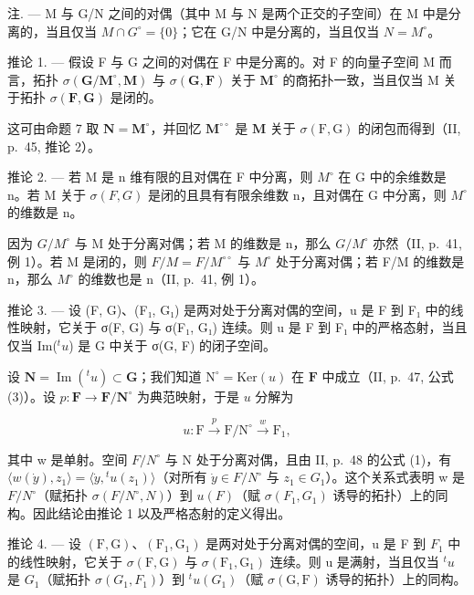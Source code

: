 注. --- M 与 G/N 之间的对偶（其中 M 与 N 是两个正交的子空间）在 M 中是分离的，当且仅当 \(M \cap G^{\circ} = \{0\}\)；它在 G/N 中是分离的，当且仅当 \(N = M^{\circ}\)。

推论 1. --- 假设 F 与 G 之间的对偶在 F 中是分离的。对 F 的向量子空间 M 而言，拓扑 \(\sigma(\mathbf{G}/\mathbf{M}^{\circ}, \mathbf{M})\) 与 \(\sigma(\mathbf{G}, \mathbf{F})\) 关于 \(\mathbf{M}^{\circ}\) 的商拓扑一致，当且仅当 M 关于拓扑 \(\sigma(\mathbf{F}, \mathbf{G})\) 是闭的。

这可由命题 7 取 \(\mathbf{N} = \mathbf{M}^{\circ}\)，并回忆 \(\mathbf{M}^{\circ \circ}\) 是 \(\mathbf{M}\) 关于 \(\sigma (\mathrm{F},\mathrm{G})\) 的闭包而得到（II, p.~45, 推论 2）。

推论 2. --- 若 M 是 n 维有限的且对偶在 F 中分离，则 \(M^{\circ}\) 在 G 中的余维数是 n。若 M 关于 \(\sigma(F, G)\) 是闭的且具有有限余维数 n，且对偶在 G 中分离，则 \(M^{\circ}\) 的维数是 n。

因为 \(G/M^{\circ}\) 与 M 处于分离对偶；若 M 的维数是 n，那么 \(G/M^{\circ}\) 亦然（II, p.~41, 例 1）。若 M 是闭的，则 \(F/M = F/M^{\circ\circ}\) 与 \(M^{\circ}\) 处于分离对偶；若 F/M 的维数是 n，那么 \(M^{\circ}\) 的维数也是 n（II, p.~41, 例 1）。

推论 3. --- 设 (F, G)、(F₁, G₁) 是两对处于分离对偶的空间，u 是 F 到 F₁ 中的线性映射，它关于 σ(F, G) 与 σ(F₁, G₁) 连续。则 u 是 F 到 F₁ 中的严格态射，当且仅当 Im(\({}^t u\)) 是 G 中关于 σ(G, F) 的闭子空间。

设 \(\mathbf{N} = \operatorname{Im}(^t u) \subset \mathbf{G}\)；我们知道 \(\mathrm{N}^{\circ} = \mathrm{Ker}(u)\) 在 \(\mathbf{F}\) 中成立（II, p.~47, 公式 (3)）。设 \(p: \mathbf{F} \to \mathbf{F}/\mathbf{N}^{\circ}\) 为典范映射，于是 \(u\) 分解为

\[
u: \mathrm{F} \xrightarrow {p} \mathrm{F} / \mathrm{N} ^ {\circ} \xrightarrow {w} \mathrm{F} _ {1},
\]

其中 w 是单射。空间 \(F/N^{\circ}\) 与 N 处于分离对偶，且由 II, p.~48 的公式 (1)，有 \(\langle w(\dot{y}), z_{1} \rangle = \langle \dot{y}, {}^{t}u(z_{1}) \rangle\)（对所有 \(\dot{y} \in F/N^{\circ}\) 与 \(z_{1} \in G_{1}\)）。这个关系式表明 w 是 \(F/N^{\circ}\)（赋拓扑 \(\sigma(F/N^{\circ}, N)\)）到 \(u(F)\)（赋 \(\sigma(F_{1}, G_{1})\) 诱导的拓扑）上的同构。因此结论由推论 1 以及严格态射的定义得出。

推论 4. --- 设 \((\mathrm{F}, \mathrm{G})\)、\((\mathrm{F}_{1}, \mathrm{G}_{1})\) 是两对处于分离对偶的空间，u 是 F 到 \(F_{1}\) 中的线性映射，它关于 \(\sigma(\mathrm{F}, \mathrm{G})\) 与 \(\sigma(\mathrm{F}_{1}, \mathrm{G}_{1})\) 连续。则 u 是满射，当且仅当 \(^{t}u\) 是 \(G_{1}\)（赋拓扑 \(\sigma(G_{1}, F_{1})\)）到 \(^{t}u(G_{1})\)（赋 \(\sigma(\mathrm{G}, \mathrm{F})\) 诱导的拓扑）上的同构。


